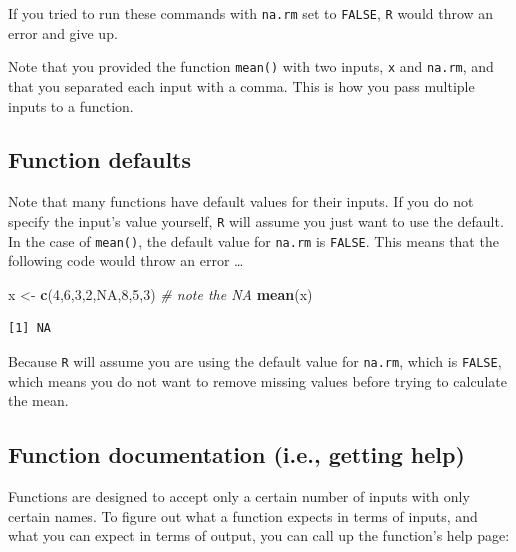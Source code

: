 \documentclass[
]{book}
\newenvironment{Shaded}{\begin{snugshade}}{\end{snugshade}}
\newcommand{\CommentTok}[1]{\textcolor[rgb]{0.56,0.35,0.01}{\textit{#1}}}
\newcommand{\DecValTok}[1]{\textcolor[rgb]{0.00,0.00,0.81}{#1}}
\newcommand{\KeywordTok}[1]{\textcolor[rgb]{0.13,0.29,0.53}{\textbf{#1}}}
\newcommand{\NormalTok}[1]{#1}
\newcommand{\OtherTok}[1]{\textcolor[rgb]{0.56,0.35,0.01}{#1}}
\newcommand{\StringTok}[1]{\textcolor[rgb]{0.31,0.60,0.02}{#1}}
\begin{document}
If you tried to run these commands with \texttt{na.rm} set to \texttt{FALSE}, \texttt{R} would throw an error and give up.

Note that you provided the function \texttt{mean()} with two inputs, \texttt{x} and \texttt{na.rm}, and that you separated each input with a comma. This is how you pass multiple inputs to a function.

\hypertarget{function-defaults}{%
\subsection*{Function defaults}\label{function-defaults}}

Note that many functions have default values for their inputs. If you do not specify the input's value yourself, \texttt{R} will assume you just want to use the default. In the case of \texttt{mean()}, the default value for \texttt{na.rm} is \texttt{FALSE}. This means that the following code would throw an error \ldots{}

\begin{Shaded}
\begin{Highlighting}[]
\NormalTok{x <-}\StringTok{ }\KeywordTok{c}\NormalTok{(}\DecValTok{4}\NormalTok{,}\DecValTok{6}\NormalTok{,}\DecValTok{3}\NormalTok{,}\DecValTok{2}\NormalTok{,}\OtherTok{NA}\NormalTok{,}\DecValTok{8}\NormalTok{,}\DecValTok{5}\NormalTok{,}\DecValTok{3}\NormalTok{)  }\CommentTok{# note the NA}
\KeywordTok{mean}\NormalTok{(x)}
\end{Highlighting}
\end{Shaded}

\begin{verbatim}
[1] NA
\end{verbatim}

Because \texttt{R} will assume you are using the default value for \texttt{na.rm}, which is \texttt{FALSE}, which means you do not want to remove missing values before trying to calculate the mean.

\hypertarget{function-documentation-i.e.-getting-help}{%
\subsection*{Function documentation (i.e., getting help)}\label{function-documentation-i.e.-getting-help}}

Functions are designed to accept only a certain number of inputs with only certain names. To figure out what a function expects in terms of inputs, and what you can expect in terms of output, you can call up the function's help page:
\end{document}
